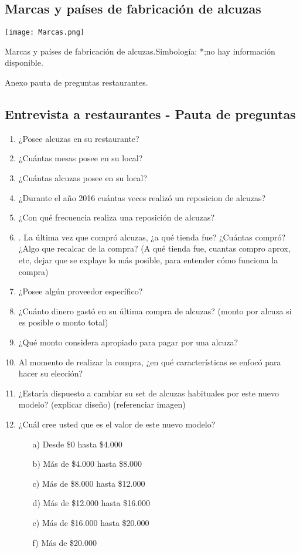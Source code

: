 \newpage
\subsection{Marcas y países de fabricación de alcuzas}
\label{MarAlc}
\begin{table}[H]
\centering
\texttt{[image: Marcas.png]}
\caption{Marcas y países de fabricación de alcuzas.Simbología: *;no hay información disponible.}
\label{Marcas}
\end{table}

\newpage

Anexo pauta de preguntas restaurantes. \label{PauEntRest}

\subsection{Entrevista a restaurantes - Pauta de preguntas}

\begin{enumerate}
\item ¿Posee alcuzas en su restaurante?
\item ¿Cuántas mesas posee en su local?
\item ¿Cuántas alcuzas posee en su local?
\item ¿Durante el año 2016 cuántas veces realizó un reposicion de alcuzas?
\item ¿Con qué frecuencia realiza una reposición de alcuzas?
\item. La última vez que compró alcuzas, ¿a qué tienda fue? ¿Cuántas compró? ¿Algo que recalcar de la compra? (A qué tienda fue, cuantas compro aprox, etc, dejar que se explaye lo más posible, para entender cómo funciona la compra)
\item ¿Posee algún proveedor específico?
\item ¿Cuánto dinero gastó en su última compra de alcuzas? (monto por alcuza si es posible o monto total)
\item ¿Qué monto considera apropiado para pagar por una alcuza?
\item Al momento de realizar la compra, ¿en qué características se enfocó para hacer su elección?
\item ¿Estaría dispuesto a cambiar su set de alcuzas habituales por este nuevo modelo? (explicar diseño) (referenciar imagen)
\item ¿Cuál cree usted que es el valor de este nuevo modelo?
\begin{itemize}
\item[a)] Desde \$0 hasta  \$4.000
\item[b)] Más de \$4.000 hasta  \$8.000
\item[c)] Más de \$8.000 hasta \$12.000
\item[d)] Más de \$12.000 hasta \$16.000
\item[e)] Más de \$16.000 hasta \$20.000
\item[f)] Más de \$20.000
\end{itemize}
\end{enumerate}

